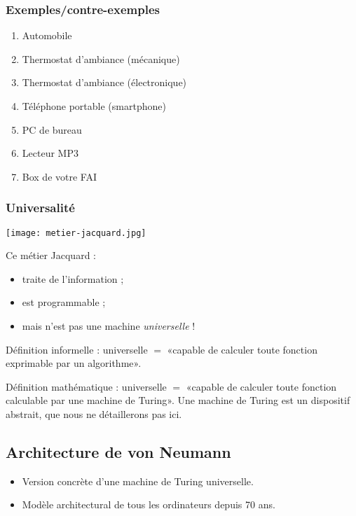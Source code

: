 \begin{multicols}{2}
\subsubsection*{Exemples/contre-exemples}

\begin{enumerate}
\item Automobile
\item Thermostat d'ambiance (mécanique)
\item Thermostat d'ambiance (électronique)
\item Téléphone portable (smartphone)
\item PC de bureau
\item Lecteur MP3
\item Box de votre FAI
\end{enumerate}

\subsubsection*{Universalité}
\begin{center}
\texttt{[image: metier-jacquard.jpg]}
\end{center}
  Ce métier Jacquard :
  \begin{itemize}
  \item traite de l'information ;
  \item est programmable ;
  \item mais n'est pas une machine \emph{universelle} !
  \end{itemize}

\begin{defi}
Définition informelle : universelle $=$ «capable de calculer toute fonction exprimable par un
algorithme».

Définition mathématique : universelle $=$ «capable de calculer toute fonction calculable par
  une machine de Turing».
Une machine de Turing est un dispositif abstrait, que nous ne détaillerons pas ici. 
\end{defi}

\subsection*{Architecture de von Neumann}

\begin{itemize}
\item Version concrète d'une machine de Turing universelle.
\item Modèle architectural de tous les ordinateurs depuis 70 ans.
\end{itemize}


\end{multicols}
